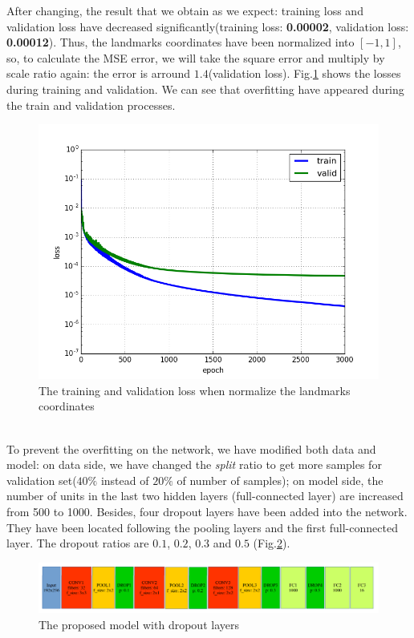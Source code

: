 \documentclass[12pt,a4paper]{article}
\begin{document}
After changing, the result that we obtain as we expect: training loss and validation loss have decreased significantly(training loss: \textbf{0.00002}, validation loss: \textbf{0.00012}). Thus, the landmarks coordinates have been normalized into $[-1,1]$, so, to calculate the MSE error, we will take the square error and multiply by scale ratio again: the error is arround $1.4$(validation loss). Fig.\ref{tvlscaletarget} shows the losses during training and validation. We can see that overfitting have appeared during the train and validation processes.
\begin{figure}[h!]
	\centering
	\includegraphics[scale=0.5]{images/figure_1_cnn3_3000_v13_loss_change2}
	\caption{The training and validation loss when normalize the landmarks coordinates}
	\label{tvlscaletarget}
\end{figure}~\\
To prevent the overfitting on the network, we have modified both data and model: on data side, we have changed the \textit{split} ratio to get more samples for validation set($40\%$ instead of $20\%$ of number of samples); on model side, the number of units in the last two hidden layers (full-connected layer) are increased from 500 to 1000. Besides, four dropout layers have been added into the network. They have been located following the pooling layers and the first full-connected layer. The dropout ratios are $0.1$, $0.2$, $0.3$ and $0.5$ (Fig.\ref{model3dropout}).
\begin{figure}[h!]
	\centering
	\includegraphics[scale=0.35]{images/model3_dropout}
	\caption{The proposed model with dropout layers}
	\label{model3dropout}
\end{figure}~\\
\end{document}
